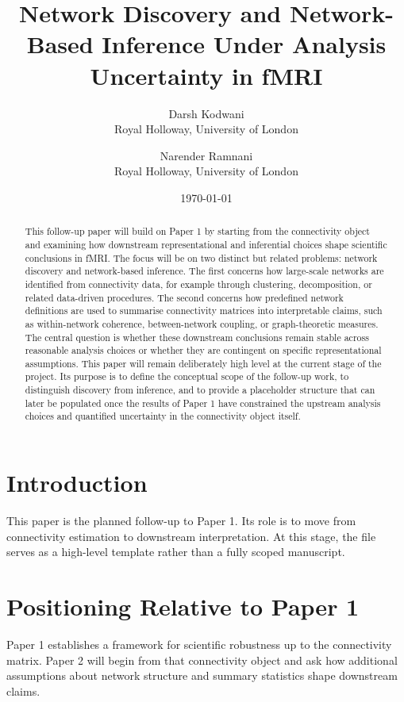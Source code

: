 \documentclass[11pt,a4paper]{article}
\title{\textbf{Network Discovery and Network-Based Inference Under Analysis Uncertainty in fMRI}}
\author{
    Darsh Kodwani\\
    \small Royal Holloway, University of London
    \and
    Narender Ramnani\\
    \small Royal Holloway, University of London
}
\date{\today}
\begin{document}
\maketitle
\tableofcontents
\newpage

\begin{abstract}
This follow-up paper will build on Paper 1 by starting from the connectivity object and examining how downstream representational and inferential choices shape scientific conclusions in fMRI. The focus will be on two distinct but related problems: network discovery and network-based inference. The first concerns how large-scale networks are identified from connectivity data, for example through clustering, decomposition, or related data-driven procedures. The second concerns how predefined network definitions are used to summarise connectivity matrices into interpretable claims, such as within-network coherence, between-network coupling, or graph-theoretic measures. The central question is whether these downstream conclusions remain stable across reasonable analysis choices or whether they are contingent on specific representational assumptions. This paper will remain deliberately high level at the current stage of the project. Its purpose is to define the conceptual scope of the follow-up work, to distinguish discovery from inference, and to provide a placeholder structure that can later be populated once the results of Paper 1 have constrained the upstream analysis choices and quantified uncertainty in the connectivity object itself.
\end{abstract}

\newpage

\section{Introduction}

This paper is the planned follow-up to Paper 1. Its role is to move from connectivity estimation to downstream interpretation. At this stage, the file serves as a high-level template rather than a fully scoped manuscript.

\section{Positioning Relative to Paper 1}

Paper 1 establishes a framework for scientific robustness up to the connectivity matrix. Paper 2 will begin from that connectivity object and ask how additional assumptions about network structure and summary statistics shape downstream claims.
\end{document}
